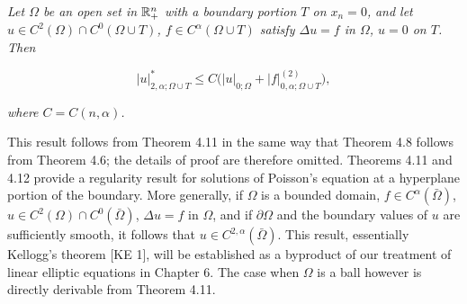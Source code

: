 \begin{theorem}\label{gt:thm-poisson-partial-boundary}
\quad \textit{Let $\Omega$ be an open set in $\mathbb{R}^{n}_{+}$ with a boundary portion $T$ on $x_n=0$,}
\textit{and let $u\in C^{2}(\Omega)\cap C^{0}(\Omega\cup T)$, $f\in C^{\alpha}(\Omega\cup T)$ satisfy $\Delta u=f$ in $\Omega$, $u=0$ on $T$.}
\textit{Then}

\begin{equation}
\tag{4.30}
|u|^*_{2,\alpha;\Omega\cup T}\leq C\bigl(|u|_{0;\Omega}+|f|^{(2)}_{0,\alpha;\Omega\cup T}\bigr),
\end{equation}

\textit{where $C=C(n,\alpha)$.}

This result follows from Theorem 4.11 in the same way that Theorem 4.8
follows from Theorem 4.6; the details of proof are therefore omitted.
Theorems 4.11 and 4.12 provide a regularity result for solutions of Poisson's
equation at a hyperplane portion of the boundary. More generally, if $\Omega$ is a
bounded domain, $f\in C^{\alpha}(\bar{\Omega})$, $u\in C^{2}(\Omega)\cap C^{0}(\bar{\Omega})$, $\Delta u=f$ in $\Omega$, and if $\partial\Omega$ and the
boundary values of $u$ are sufficiently smooth, it follows that $u\in C^{2,\alpha}(\bar{\Omega})$. This result,
essentially Kellogg's theorem [KE 1], will be established as a byproduct of our
treatment of linear elliptic equations in Chapter 6. The case when $\Omega$ is a ball
however is directly derivable from Theorem 4.11.

\medskip

\end{theorem}

